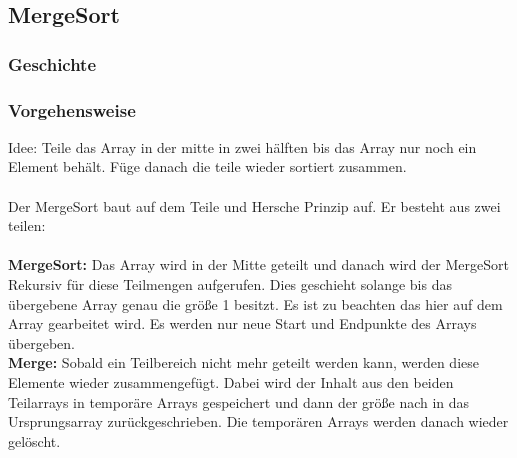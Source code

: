 \documentclass{article}
\begin{document}
\subsection{MergeSort}
\subsubsection{Geschichte}
\subsubsection{Vorgehensweise}
Idee: Teile das Array in der mitte in zwei hälften bis das Array nur noch ein Element behält. Füge danach die teile wieder sortiert zusammen. \\
\\
Der MergeSort baut auf dem Teile und Hersche Prinzip auf. Er besteht aus zwei teilen:
\\ \\
\textbf{MergeSort:} Das Array wird in der Mitte geteilt und danach wird der MergeSort Rekursiv für diese Teilmengen aufgerufen. Dies geschieht solange bis das übergebene Array genau die größe 1 besitzt. Es ist zu beachten das hier auf dem Array gearbeitet wird. Es werden nur neue Start und Endpunkte des Arrays übergeben. \\
\textbf{Merge: } Sobald ein Teilbereich nicht mehr geteilt werden kann, werden diese Elemente wieder zusammengefügt. Dabei wird der Inhalt aus den beiden Teilarrays in temporäre Arrays gespeichert und dann der größe nach in das Ursprungsarray zurückgeschrieben. Die temporären Arrays werden danach wieder gelöscht. 
\end{document}
